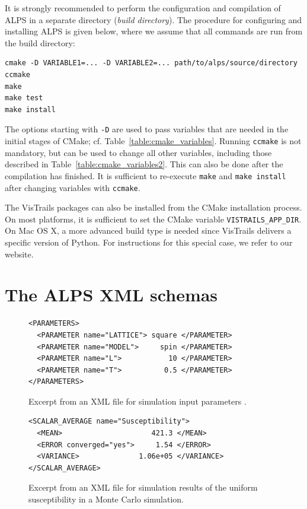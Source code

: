 \documentclass[12pt]{iopart}
\begin{document}
It is strongly recommended to perform the configuration and compilation of ALPS in a separate directory ({\it build directory}). The procedure for configuring and installing ALPS is given below, where we assume that all commands are run from the build directory:
{\small
\begin{verbatim}
cmake -D VARIABLE1=... -D VARIABLE2=... path/to/alps/source/directory
ccmake
make
make test
make install
\end{verbatim}}
The options starting with {\tt -D} are used to pass variables that are needed in the initial stages of CMake; cf. Table~\ref{table:cmake_variables}. Running {\tt ccmake} is not mandatory, but can be used to change all other variables, including those described in Table~\ref{table:cmake_variables2}. This can also be done after the compilation has finished. It is sufficient to re-execute {\tt make} and {\tt make install} after changing variables with {\tt ccmake}.

The VisTrails packages can also be installed from the CMake installation process. On most platforms, it is sufficient to set the CMake variable {\tt VISTRAILS\_APP\_DIR}. On Mac OS X, a more advanced build type is needed since VisTrails delivers a specific version of Python. For instructions for this special case, we refer to our website.

\section{The ALPS XML schemas}
\label{sec:xml}

\begin{figure}[tb]
\begin{lstlisting}
<PARAMETERS>
  <PARAMETER name="LATTICE"> square </PARAMETER>
  <PARAMETER name="MODEL">     spin </PARAMETER>
  <PARAMETER name="L">           10 </PARAMETER>
  <PARAMETER name="T">          0.5 </PARAMETER>
</PARAMETERS>
\end{lstlisting}
\caption{Excerpt from an XML file for simulation input parameters .}
\label{fig:parm}
\end{figure}
\begin{figure}[tb]
\begin{lstlisting}
<SCALAR_AVERAGE name="Susceptibility">
  <MEAN>                     421.3 </MEAN>
  <ERROR converged="yes">     1.54 </ERROR>
  <VARIANCE>              1.06e+05 </VARIANCE>
</SCALAR_AVERAGE>
\end{lstlisting}
\caption{Excerpt from an XML file for simulation results of the uniform susceptibility in a Monte Carlo simulation.}
\label{fig:result}
\end{figure}
\end{document}

